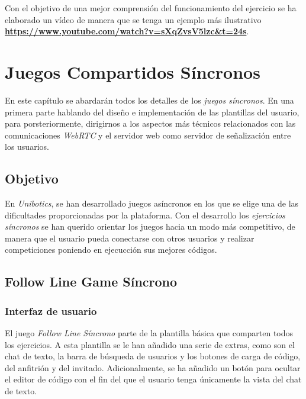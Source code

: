 \documentclass[a4paper, 12pt]{book}
\begin{document}
Con el objetivo de una mejor comprensión del funcionamiento del ejercicio se ha elaborado un vídeo de manera que se tenga un ejemplo más ilustrativo \textbf{\url{https://www.youtube.com/watch?v=sXqZvsV5lzc&t=24s}}.


\cleardoublepage
\chapter{Juegos Compartidos Síncronos}

En este capítulo se abardarán todos los detalles de los \emph{juegos síncronos}. En una primera parte hablando del diseño e implementación de las plantillas del usuario, para porsteriormente, dirigirnos a los aspectos más técnicos relacionados con las comunicaciones \emph{WebRTC} y el servidor web como servidor de señalización entre los usuarios.

\section{Objetivo}
\label{sync_objective}

En \emph{Unibotics}, se han desarrollado juegos asíncronos en los que se elige una de las dificultades proporcionadas por la plataforma. Con el desarrollo los \emph{ejercicios síncronos} se han querido orientar los juegos hacia un modo más competitivo, de manera que el usuario pueda conectarse con otros usuarios y realizar competiciones poniendo en ejecucción sus mejores códigos.

\section{Follow Line Game Síncrono} 
\label{sec:follow_line_game_sync}

\subsection{Interfaz de usuario}

El juego \emph{Follow Line Síncrono} parte de la plantilla básica que comparten todos los ejercicios. A esta plantilla se le han añadido una serie de extras, como son el chat de texto, la barra de búsqueda de usuarios y los botones de carga de código, del anfitrión y del invitado. Adicionalmente, se ha añadido un botón para ocultar el editor de código con el fin del que el usuario tenga únicamente la vista del chat de texto.
\end{document}
